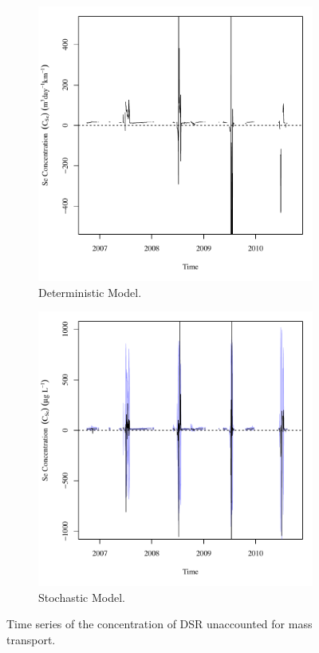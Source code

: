 \begin{linenumbers}
\begin{figure}[htbp]
\centering
	\begin{subfigure}{0.5\textwidth}
		\centering
		\includegraphics[width=0.9\linewidth]{"Figures/Results_DDSR/Balance C"}
		\caption{Deterministic Model.}
	\end{subfigure}%
	\begin{subfigure}{0.5\textwidth}
		\centering
		\includegraphics[width=0.9\linewidth]{"Figures/Results_DSR/Balance C"}
		\caption{Stochastic Model.}
	\end{subfigure}
	\caption[Time series of the concentration of DSR unaccounted for mass transport.]{Time series of the concentration of DSR unaccounted for mass transport.}
	\label{fig:DSRC}
\end{figure}


\end{linenumbers}
